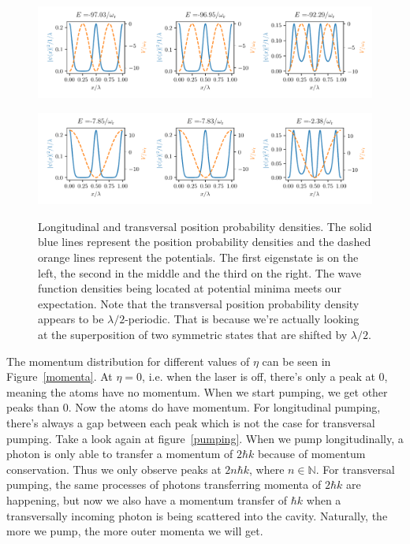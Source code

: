 \begin{figure}[!htb]
	\begin{minipage}[b]{1\linewidth}
	\centering
	\includegraphics[width=1\textwidth]{images/dens_long.pdf}
	\label{long_density}
	\end{minipage}
%
	\begin{minipage}[b]{1\linewidth}
	\centering
	\includegraphics[width=1\textwidth]{images/dens_trans.pdf}
	\label{trans_density}
	\end{minipage}
\caption{Longitudinal and transversal position probability densities. The solid blue lines represent the position probability densities and the dashed orange lines represent the potentials. The first eigenstate is on the left, the second in the middle and the third on the right. The wave function densities being located at potential minima meets our expectation. Note that the transversal position probability density appears to be $\lambda / 2$-periodic. That is because we're actually looking at the superposition of two symmetric states that are shifted by $\lambda / 2$.}
\label{densities}
\end{figure}
\FloatBarrier

\noindent The momentum distribution for different values of $\eta$ can be seen in Figure~\ref{momenta}. At $\eta = 0$, i.e. when the laser is off, there's only a peak at 0, meaning the atoms have no momentum. When we start pumping, we get other peaks than 0. Now the atoms do have momentum. For longitudinal pumping, there's always a gap between each peak which is not the case for transversal pumping. Take a look again at figure~\ref{pumping}. When we pump longitudinally, a photon is only able to transfer a momentum of $2 \hbar k$ because of momentum conservation. Thus we only observe peaks at $2n\hbar k$, where $n \in \mathbb{N}$. For transversal pumping, the same processes of photons transferring momenta of $2\hbar k$ are happening, but now we also have a momentum transfer of $\hbar k$ when a transversally incoming photon is being scattered into the cavity. Naturally, the more we pump, the more outer momenta we will get.

